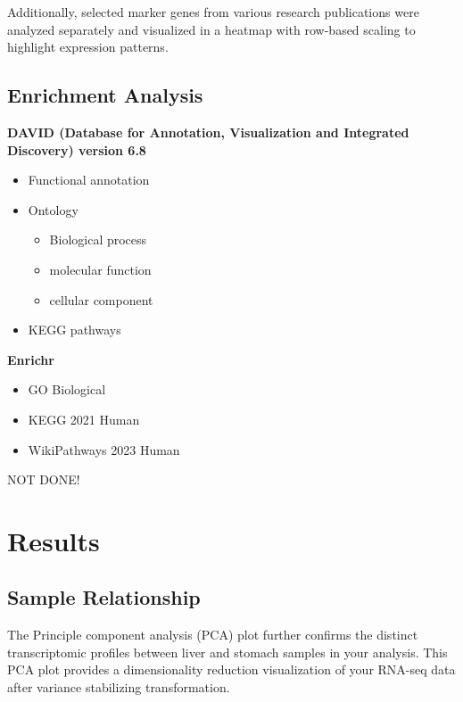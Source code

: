 \documentclass[
]{article}
\providecommand{\tightlist}{%
  \setlength{\itemsep}{0pt}\setlength{\parskip}{0pt}}
\begin{document}
Additionally, selected marker genes from various research publications
were analyzed separately and visualized in a heatmap with row-based
scaling to highlight expression patterns.

\subsection{Enrichment Analysis}\label{enrichment-analysis}

\textbf{DAVID (Database for Annotation, Visualization and Integrated
Discovery) version 6.8}

\begin{itemize}
\item
  Functional annotation
\item
  Ontology

  \begin{itemize}
  \tightlist
  \item
    Biological process
  \item
    molecular function
  \item
    cellular component
  \end{itemize}
\item
  KEGG pathways
\end{itemize}

\textbf{Enrichr}

\begin{itemize}
\tightlist
\item
  GO Biological
\item
  KEGG 2021 Human
\item
  WikiPathways 2023 Human
\end{itemize}

NOT DONE!

\newpage

\section{Results}\label{results}

\subsection{Sample Relationship}\label{sample-relationship}

The Principle component analysis (PCA) plot further confirms the
distinct transcriptomic profiles between liver and stomach samples in
your analysis. This PCA plot provides a dimensionality reduction
visualization of your RNA-seq data after variance stabilizing
transformation.
\end{document}
